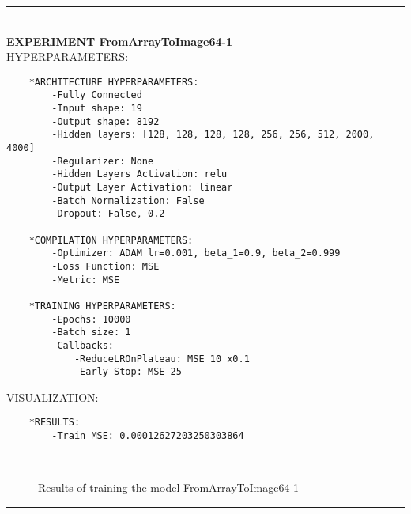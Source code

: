 \rule{0.5\textwidth}{0.5pt}\\

	{\large \textbf{EXPERIMENT FromArrayToImage64-1}}\\
	
	{\normalsize HYPERPARAMETERS:}
	\begin{lstlisting}	
	*ARCHITECTURE HYPERPARAMETERS:
		-Fully Connected
		-Input shape: 19
		-Output shape: 8192
		-Hidden layers: [128, 128, 128, 128, 256, 256, 512, 2000, 4000]
		-Regularizer: None
		-Hidden Layers Activation: relu
		-Output Layer Activation: linear
		-Batch Normalization: False
		-Dropout: False, 0.2
	
	*COMPILATION HYPERPARAMETERS:
		-Optimizer: ADAM lr=0.001, beta_1=0.9, beta_2=0.999
		-Loss Function: MSE
		-Metric: MSE
	
	*TRAINING HYPERPARAMETERS:
		-Epochs: 10000
		-Batch size: 1
		-Callbacks: 
			-ReduceLROnPlateau: MSE 10 x0.1
			-Early Stop: MSE 25
	\end{lstlisting}
	
	{\normalsize VISUALIZATION:}
	\begin{lstlisting}
	*RESULTS:
        -Train MSE: 0.00012627203250303864
	\end{lstlisting}
	
	\begin{figure*}[ht!]
		\hspace{\fill}
		\hspace{\fill}
		\\
		\caption{Results of training the model FromArrayToImage64-1}
	\end{figure*}
	
\FloatBarrier	
\rule{0.5\textwidth}{0.5pt}\\